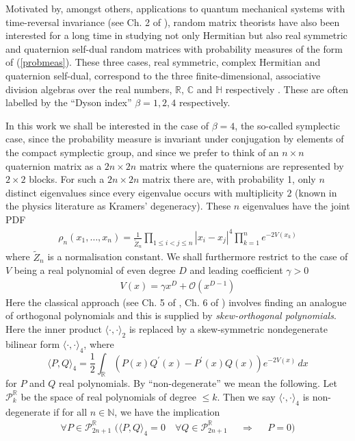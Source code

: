 \documentclass[12pt]{article}
\theoremstyle{definition}
\begin{document}
Motivated by, amongst others, applications to quantum mechanical systems with time-reversal invariance (see Ch. 2 of \cite{mehta}),  random matrix theorists have also been interested for a long time in studying not only Hermitian but also real symmetric and quaternion self-dual random matrices with probability measures of the form of (\ref{probmeas}).  These three cases, real symmetric, complex Hermitian and quaternion self-dual, correspond to the three finite-dimensional, associative division algebras over the real numbers, $\mathbb{R}$, $\mathbb{C}$ and $\mathbb{H}$ respectively \cite{Dyson3}.  These are often labelled by the \enquote{Dyson index} $\beta=1,2,4$ respectively. 

In this work we shall be interested in the case of $\beta = 4$, the so-called symplectic case, since the probability measure is invariant under conjugation by elements of the compact symplectic group,  and since we prefer to think of an $n\times n$ quaternion matrix as a $2n \times 2n$ matrix where the quaternions are represented by $2 \times 2$ blocks. For such a $2n \times 2n$ matrix there are, with probability 1, only $n$ distinct eigenvalues since every eigenvalue occurs with multiplicity $2$ (known in the physics literature as Kramers' degeneracy).  These $n$ eigenvalues have the joint PDF
\begin{align}\label{pointprocess}
\rho_n(x_1, \dots, x_n) = \frac{1}{\tilde{Z}_n} \prod_{1 \leq i < j \leq n}|x_i - x_j|^4 \prod_{k=1}^{n} e^{-2V(x_k)}
\end{align}
where $\tilde{Z}_n $ is a normalisation constant.  We shall furthermore restrict to the case of $V$ being a real polynomial of even degree $D$ and leading coefficient $\gamma > 0$
\begin{align}
V(x) = \gamma x^D + \mathcal{O}(x^{D-1})
\end{align}
Here the classical approach (see Ch. 5 of \cite{mehta},  Ch. 6 of \cite{loggases}) involves finding an analogue of orthogonal polynomials and this is supplied by \textit{skew-orthogonal polynomials}.  Here the inner product $\langle \cdot, \cdot \rangle_2$ is replaced by a skew-symmetric nondegenerate bilinear form $\langle \cdot, \cdot \rangle_4$, where
\begin{equation}\label{skewprod}
\langle P, Q \rangle_4 = \frac{1}{2} \int_{\mathbb{R}} \left( P(x) Q^\prime(x)-P^\prime(x) Q(x) \right) e^{-2V(x)}\, dx
\end{equation}
for $P$ and $Q$ real polynomials.  By \enquote{non-degenerate} we mean the following. Let $\mathscr{P}_k^\mathbb{R}$ be the space of real polynomials of degree $\leq k$.  Then we say $\langle \cdot, \cdot \rangle_4$ is non-degenerate if for all $n \in \mathbb{N}$,  we have the implication
\begin{align*}
\forall P \in \mathscr{P}_{2n+1}^\mathbb{R} \, \,  \bigg(  \langle P, Q \rangle_4 = 0 \quad \forall Q \in  \mathscr{P}_{2n+1}^\mathbb{R} & &  \Longrightarrow & & P = 0\bigg)
\end{align*}
\end{document}
